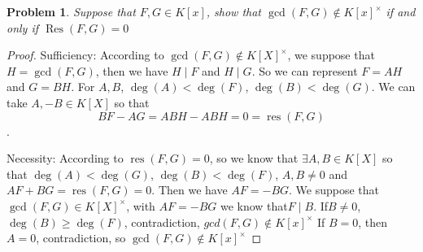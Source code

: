 \documentclass{article}
\newtheorem{problem}{Problem}
\begin{document}
\begin{problem}
Suppose that \(F,G \in K[x]\), show that \(\gcd(F,G) \notin K[x]^{\times}\) if and only if
\(\operatorname{Res}(F,G)=0\)
\end{problem}

\begin{proof}

    Sufficiency: According to \(\gcd(F,G) \notin K[X]^{\times}\), we suppose that \(H=\gcd(F,G)\), then we have \(H \mid F\) and \(H \mid G\). So we can represent \(F = AH\) and
    \(G = BH\). For \(A,B\), \(\deg(A) < \deg(F)\), \(\deg(B)<\deg(G)\). We can take \(A,-B \in K[X]\) so that \[BF-AG=ABH-ABH=0=\operatorname{res}(F,G)\].

    Necessity: According to \(\operatorname{res}(F,G)=0\), so we know that \(\exists A, B \in K[X]\) so that \(\deg(A)<\deg(G)\), \(\deg(B)<\deg(F)\), \(A,B \neq0\) and \(AF+BG=\operatorname{res}(F,G)=0\).
    Then we have \(AF = -BG\). We suppose that \(\gcd(F,G) \in K[X]^{\times}\), with \(AF=-BG\) we know that\(F \mid B\). If\(B \neq 0\), \(\deg(B) \ge \deg(F)\), contradiction, \(gcd(F,G) \notin K[x]^{\times}\)
    If \(B = 0\), then \(A = 0\), contradiction, so \(\gcd(F,G) \notin K[x]^{\times}\)

\end{proof}
\end{document}
